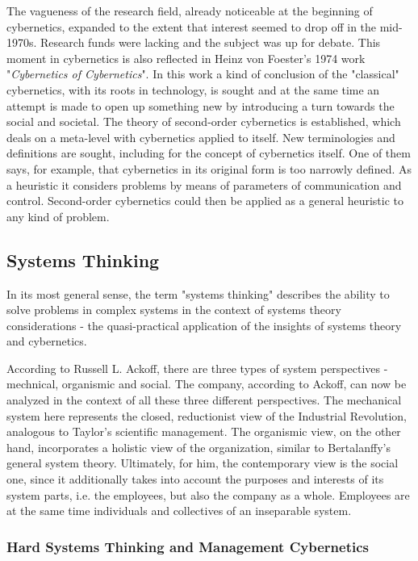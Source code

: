 \documentclass[a4paper,12pt]{scrartcl}
\begin{document}
The vagueness of the research field, already noticeable at the beginning of cybernetics, expanded to the extent that interest seemed to drop off in the mid-1970s. Research funds were lacking and the subject was up for debate. This moment in cybernetics is also reflected in Heinz von Foester's 1974 work "\textit{Cybernetics of Cybernetics}". In this work a kind of conclusion of the "classical" cybernetics, with its roots in technology, is sought and at the same time an attempt is made to open up something new by introducing a turn towards the social and societal. The theory of second-order cybernetics is established, which deals on a meta-level with cybernetics applied to itself. New terminologies and definitions are sought, including for the concept of cybernetics itself. One of them says, for example, that cybernetics in its original form is too narrowly defined. As a heuristic it considers problems by means of parameters of communication and control. Second-order cybernetics could then be applied as a general heuristic to any kind of problem.\cite{mueller:2008}

\subsection{Systems Thinking}

In its most general sense, the term "systems thinking" describes the ability to solve problems in complex systems in the context of systems theory considerations - the quasi-practical application of the insights of systems theory and cybernetics.

According to Russell L. Ackoff, there are three types of system perspectives - mechnical, organismic and social. The company, according to Ackoff, can now be analyzed in the context of all these three different perspectives. The mechanical system here represents the closed, reductionist view of the Industrial Revolution, analogous to Taylor's scientific management.
The organismic view, on the other hand, incorporates a holistic view of the organization, similar to Bertalanffy's general system theory. Ultimately, for him, the contemporary view is the social one, since it additionally takes into account the purposes and interests of its system parts, i.e. the employees, but also the company as a whole. Employees are at the same time individuals and collectives of an inseparable system.\cite{ackoff:1994}

\subsubsection{Hard Systems Thinking and Management Cybernetics}
\end{document}
